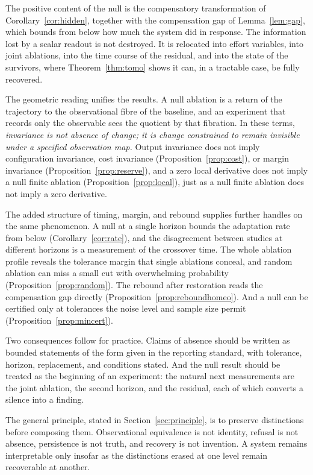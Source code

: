 \documentclass[11pt]{article}
\theoremstyle{definition}
\theoremstyle{remark}
\begin{document}
The positive content of the null is the compensatory transformation of Corollary~\ref{cor:hidden}, together with the compensation gap of Lemma~\ref{lem:gap}, which bounds from below how much the system did in response. The information lost by a scalar readout is not destroyed. It is relocated into effort variables, into joint ablations, into the time course of the residual, and into the state of the survivors, where Theorem~\ref{thm:tomo} shows it can, in a tractable case, be fully recovered.

The geometric reading unifies the results. A null ablation is a return of the trajectory to the observational fibre of the baseline, and an experiment that records only the observable sees the quotient by that fibration. In these terms, \emph{invariance is not absence of change; it is change constrained to remain invisible under a specified observation map.} Output invariance does not imply configuration invariance, cost invariance (Proposition~\ref{prop:cost}), or margin invariance (Proposition~\ref{prop:reserve}), and a zero local derivative does not imply a null finite ablation (Proposition~\ref{prop:local}), just as a null finite ablation does not imply a zero derivative.

The added structure of timing, margin, and rebound supplies further handles on the same phenomenon. A null at a single horizon bounds the adaptation rate from below (Corollary~\ref{cor:rate}), and the disagreement between studies at different horizons is a measurement of the crossover time. The whole ablation profile reveals the tolerance margin that single ablations conceal, and random ablation can miss a small cut with overwhelming probability (Proposition~\ref{prop:random}). The rebound after restoration reads the compensation gap directly (Proposition~\ref{prop:reboundhomeo}). And a null can be certified only at tolerances the noise level and sample size permit (Proposition~\ref{prop:mincert}).

Two consequences follow for practice. Claims of absence should be written as bounded statements of the form given in the reporting standard, with tolerance, horizon, replacement, and conditions stated. And the null result should be treated as the beginning of an experiment: the natural next measurements are the joint ablation, the second horizon, and the residual, each of which converts a silence into a finding.

The general principle, stated in Section~\ref{sec:principle}, is to preserve distinctions before composing them. Observational equivalence is not identity, refusal is not absence, persistence is not truth, and recovery is not invention. A system remains interpretable only insofar as the distinctions erased at one level remain recoverable at another.
\end{document}
